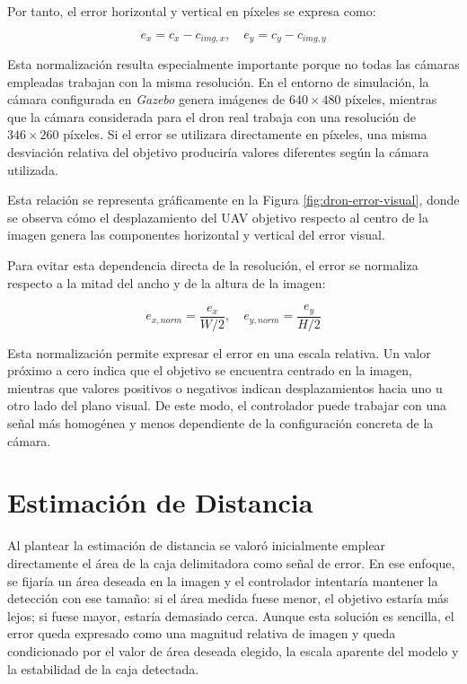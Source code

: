 Por tanto, el error horizontal y vertical en píxeles se expresa como:

\begin{equation}
e_x = c_x - c_{img,x}, \quad e_y = c_y - c_{img,y}
\end{equation}

\vspace{0.3cm}

Esta normalización resulta especialmente importante porque no todas las cámaras empleadas trabajan con la misma resolución. En el entorno de simulación, la cámara configurada en \textit{Gazebo} genera imágenes de $640 \times 480$ píxeles, mientras que la cámara considerada para el dron real trabaja con una resolución de $346 \times 260$ píxeles. Si el error se utilizara directamente en píxeles, una misma desviación relativa del objetivo produciría valores diferentes según la cámara utilizada.


\vspace{0.3cm}

Esta relación se representa gráficamente en la Figura \ref{fig:dron-error-visual}, donde se observa cómo el desplazamiento del UAV objetivo respecto al centro de la imagen genera las componentes horizontal y vertical del error visual.

\vspace{0.3cm}


Para evitar esta dependencia directa de la resolución, el error se normaliza respecto a la mitad del ancho y de la altura de la imagen:

\begin{equation}
e_{x,norm} = \frac{e_x}{W/2}, \quad e_{y,norm} = \frac{e_y}{H/2}
\end{equation}

Esta normalización permite expresar el error en una escala relativa. Un valor próximo a cero indica que el objetivo se encuentra centrado en la imagen, mientras que valores positivos o negativos indican desplazamientos hacia uno u otro lado del plano visual. De este modo, el controlador puede trabajar con una señal más homogénea y menos dependiente de la configuración concreta de la cámara.


\section{Estimación de Distancia}

Al plantear la estimación de distancia se valoró inicialmente emplear directamente el área de la caja delimitadora como señal de error. En ese enfoque, se fijaría un área deseada en la imagen y el controlador intentaría mantener la detección con ese tamaño: si el área medida fuese menor, el objetivo estaría más lejos; si fuese mayor, estaría demasiado cerca. Aunque esta solución es sencilla, el error queda expresado como una magnitud relativa de imagen y queda condicionado por el valor de área deseada elegido, la escala aparente del modelo y la estabilidad de la caja detectada.

